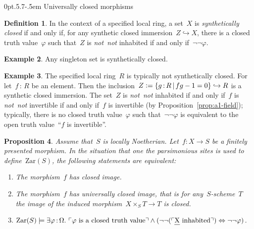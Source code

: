 \documentclass[10pt,reqno,a4paper]{amsbook}
\makeatletter
\theoremstyle{definition}
\newtheorem{defn}{Definition}[section]
\newtheorem{ex}[defn]{Example}
\theoremstyle{plain}
\newtheorem{prop}[defn]{Proposition}
\theoremstyle{remark}
\let\oldul\ul
\renewcommand{\ul}[1]{\text{\oldul{$#1$}}}
\newcommand{\Zar}{\mathrm{Zar}}
\newcommand{\?}{\,{:}\,}
\renewcommand{\_}{\mathpunct{.}\,}
\newcommand{\speak}[1]{\ulcorner\text{\textnormal{#1}}\urcorner}
\newcommand{\notnot}{\emph{not~not}\xspace}
\newcommand{\defeq}{\vcentcolon=}
\def\subsection{\@startsection{subsection}{2}%
  {0pt}{.5\linespacing\@plus.7\linespacing}{-.5em}%
  {\normalfont\bfseries}}
\makeatother
\begin{document}
\subsection{Universally closed morphisms}

\begin{defn}In the context of a specified local ring, a set~$X$ is
\emph{synthetically closed} if and only if, for any synthetic closed
immersion~$Z \hookrightarrow X$, there is a closed truth value~$\varphi$ such
that~$Z$ is \notnot inhabited if and only if~$\neg\neg\varphi$.
\end{defn}

\begin{ex}\label{ex:singleton-synth-closed}
Any singleton set is synthetically closed.\end{ex}

\begin{ex}\label{ex:r-not-synth-closed}
The specified local ring~$R$ is typically not synthetically closed.
For let~$f \? R$ be an element. Then the inclusion~$Z \defeq \{ g \? R \,|\,
fg - 1 = 0 \} \hookrightarrow R$ is a synthetic closed immersion. The set~$Z$ is \notnot inhabited if and
only if~$f$ is \notnot invertible if and only if~$f$ is invertible (by
Proposition~\ref{prop:a1-field}); typically, there is no closed truth
value~$\varphi$ such that~$\neg\neg\varphi$ is equivalent to the open truth
value~``$f$ is invertible''.\end{ex}

\begin{prop}\label{prop:char-closed-image}
Assume that~$S$ is locally Noetherian. Let~$f : X \to S$ be a
finitely presented morphism. In the situation that one the parsimonious
sites is used to define~$\Zar(S)$, the following statements are equivalent:
\begin{enumerate}
\item The morphism~$f$ has closed image.
\item The morphism~$f$ has universally closed image, that is for
any~$S$-scheme~$T$ the image of the induced morphism~$X \times_S T \to T$ is
closed.
\item $\Zar(S) \models \exists \varphi\?\Omega\_
  \speak{$\varphi$ is a closed truth value} \wedge
  (\neg\neg(\speak{$\ul{X}$ inhabited}) \Leftrightarrow \neg\neg\varphi)$.
\end{enumerate}
\end{prop}
\end{document}
